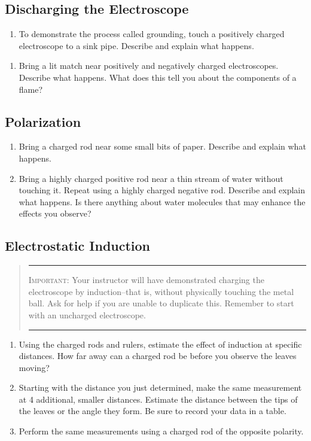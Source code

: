 \subsection{Discharging the Electroscope}
\begin{enumerate}[resume]
 \item To demonstrate the process called grounding, touch a positively charged electroscope to a sink pipe.  Describe and explain what happens.
\end{enumerate}
\begin{enumerate}[resume]
	\item Bring a lit match near positively and negatively charged electroscopes. Describe what happens.  What does this tell you about the components of a flame?

\end{enumerate}
\subsection{Polarization}
\begin{enumerate}[resume]
	\item Bring a charged rod near some small bits of paper.  Describe and explain what happens.
	\item Bring a highly charged positive rod near a thin stream of water without touching it.  Repeat using a highly charged negative rod.  Describe and explain what happens. Is there anything about water molecules that may enhance the effects you observe?
\end{enumerate}

\subsection{Electrostatic Induction}
\begin{quote}\hrule
\textsc{Important:}
Your instructor will have demonstrated charging the electroscope by induction--that is, without physically touching the metal ball.  Ask for help if you are unable to duplicate this.  Remember to start with an uncharged electroscope.
\hrule
\end{quote}

\begin{enumerate}[resume]
	\item Using the charged rods and rulers, estimate the effect of induction at specific distances.  How far away can a charged rod be before you observe the leaves moving?
	 \item Starting with the distance you just determined, make the same measurement at 4 additional, smaller distances.  Estimate the distance between the tips of the leaves or the angle they form.  Be sure to record your data in a table.
	 \item Perform the same measurements using a charged rod of the opposite polarity.
\end{enumerate}
 

